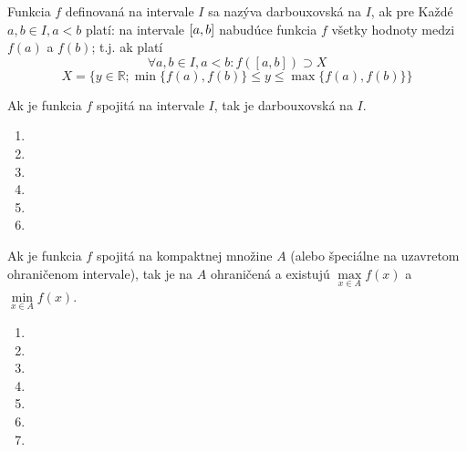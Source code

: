 Funkcia $f$ definovaná na intervale $I$ sa nazýva darbouxovská na $I$, ak pre
Každé $a,b \in I,a<b$ platí: na intervale $\interval{a}{b}$ nabudúce funkcia $f$
všetky hodnoty medzi $f(a)$ a $f(b)$; t.j. ak platí
\[
  \forall a, b \in I, a < b:
    f(\left[ a, b \right] ) \supset X
\]
\[
  X = \{y \in \mathbb{R}; \min \{f(a),f(b)\} \leq y \leq \max \{f(a),f(b)\}\}
\]

\begin{veta}
Ak je funkcia $f$ spojitá na intervale $I$, tak je darbouxovská na $I$.
\end{veta}

\begin{enumerate}[resume]
  \item {}
  \item {}
  \item {}
  \item {}
  \item {}
  \item {}
\end{enumerate}

\begin{veta}
Ak je funkcia $f$ spojitá na kompaktnej množine $A$ (alebo špeciálne na
uzavretom ohraničenom intervale), tak je na $A$ ohraničená a existujú
$\max\limits_{x \in A}f(x)$ a $\min\limits_{x \in A}f(x)$.
\end{veta}

\begin{enumerate}[resume]
  \item {}
  \item {}
  \item {}
  \item {}
  \item {}
  \item {}
  \item {}
\end{enumerate}
